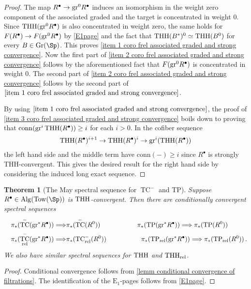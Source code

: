\documentclass[english,10pt]{amsart}
\newcommand{\rel}{\textup{rel}}
\newtheorem{thm}{Theorem}[section]
\theoremstyle{definition}
\numberwithin{equation}{section}
\DeclareMathOperator{\TC}{TC}
\DeclareMathOperator{\thh}{\ensuremath{\textup{THH}}}
\newcommand{\rtp}{\mathrm{TP}_{\rel}}
\newcommand{\rtc}{\mathrm{TC}_{\rel}}
\newcommand{\rthh}{\mathrm{THH}_{\rel}}
\newcommand{\Tow}{\mathrm{Tow}}
\newcommand{\Alg}{\mathrm{Alg}}
\newcommand{\TP}{\mathrm{TP}}
\newcommand{\gr}{\textup{gr}^*}
\newcommand{\grzero}{\textup{gr}^0}
\newcommand{\Gr}{\textup{Gr}}
\begin{document}
\begin{proof}
The map $R^\bullet \to \grzero R^\bullet$ induces an isomorphism in the weight zero component of the associated graded and the target is concentrated in weight $0$. Since $\thh(\grzero R^\bullet)$ is also concentrated in weight zero, the same holds for $F(R^\bullet) \to F(\grzero R^\bullet)$ by \autoref{E1page} and the fact that $\thh(B^*)^0 \simeq \thh(B^0)$ for every $B \in \Gr(\Sp)$. This proves \eqref{item 1 coro frel associated graded and strong convergence}. Now  the first part of \eqref{item 2 coro frel associated graded and strong convergence} follows by the aforementioned fact that $F(\grzero R^\bullet)$ is concentrated in weight $0$. The second part of \eqref{item 2 coro frel associated graded and strong convergence} follows by the second part of $\eqref{item 1 coro frel associated graded and strong convergence}$.



By using $\eqref{item 1 coro frel associated graded and strong convergence}$, the proof of \eqref{item 3 coro frel associated graded and strong convergence} boils down to proving that $\mathrm{conn}(\textup{gr}^i\thh(R^\bullet)) \geq i$ for each $i >0$. In the cofiber sequence 
\[\thh(R^\bullet)^{i+1} \to \thh(R^\bullet)^i \to \textup{gr}^i(\thh(R^\bullet))\]
the left hand side and the middle term have $\mathrm{conn}(-) \geq i$ since $R^\bullet$ is strongly THH-convergent. This gives the desired result for the right hand side by considering the induced long exact sequence. 
\end{proof}


\begin{thm}[The May spectral sequence for $\TC^{-}$ and $\TP$]\label{mayss}
Suppose $R^{\bullet}\in \Alg(\Tow(\Sp))$ is $\thh$-convergent. Then there are conditionally convergent spectral sequences
\begin{equation*} 
\begin{split}
 \pi_*(\TC^{-}(\gr R^{\bullet} ))\Longrightarrow& \pi_*(\TC^{-}(R^0)) \qquad \textup{ \ \ \ \ }\qquad  
 \pi_*(\TP(\gr R^{\bullet} )) \Longrightarrow\pi_*(\TP(R^0))\\
 \textup{\ \ \ }\pi_*(\TC^{-}_{\rel}(\gr R^{\bullet} )) \Longrightarrow & \pi_*(\rtc^{-}(R^0))    \qquad \textup{ \ \ \ }\qquad 
 \pi_*(\TP_{\rel}(\gr R^{\bullet} )) \Longrightarrow\pi_*(\rtp (R^0))\,.
\end{split}
\end{equation*}
We also have similar spectral sequences for $\thh$ and $\rthh$.
\end{thm}
\begin{proof}
Conditional convergence follows from \autoref{lemm conditional convergence of filtrations}. The identification of the $\mathrm{E}_1$-pages follows from \autoref{E1page}.
\end{proof}
\end{document}
